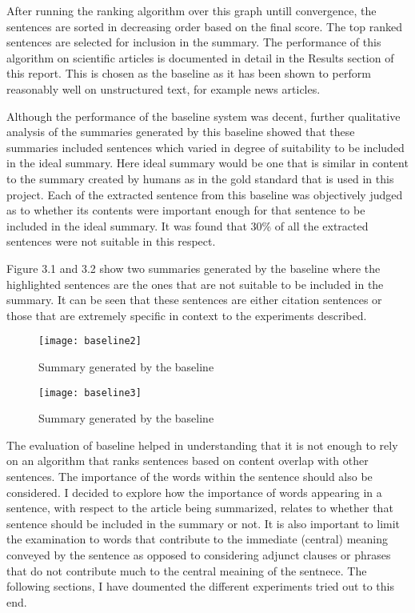 After running the ranking algorithm over this graph untill convergence, the sentences are sorted in decreasing order based on the final score.
The top ranked sentences are selected for inclusion in the summary.
The performance of this algorithm on scientific articles is documented in detail in the Results section of this report.
This is chosen as the baseline as it has been shown to perform reasonably well on unstructured text, for example news articles.

Although the performance of the baseline system was decent, further qualitative analysis of the summaries generated by this baseline showed that these summaries included sentences which varied in degree of suitability to be included in the ideal summary.
Here ideal summary would be one that is similar in content to the summary created by humans as in the gold standard that is used in this project.
Each of the extracted sentence from this baseline was objectively judged as to whether its contents were important enough for that sentence to be included in the ideal summary.
It was found that 30\% of all the extracted sentences were not suitable in this respect.

Figure 3.1 and 3.2 show two summaries generated by the baseline where the highlighted sentences are the ones that are not suitable to be included in the summary.
It can be seen that these sentences are either citation sentences or those that are extremely specific in context to the experiments described.

\begin{figure}[h]
\texttt{[image: baseline2]} 
\label{fig:base1}
\caption{Summary generated by the baseline}
\end{figure}
\begin{figure}[h]
\texttt{[image: baseline3]}
\label{fig:base2}
\caption{Summary generated by the baseline}
\label{fig:baseline}
\end{figure}

The evaluation of baseline helped in understanding that it is not enough to rely on an algorithm that ranks sentences based on content overlap with other sentences.
The importance of the words within the sentence should also be considered.
I decided to explore how the importance of words appearing in a sentence, with respect to the article being summarized, relates to whether that sentence should be included in the summary or not.
It is also important to limit the examination to words that contribute to the immediate (central) meaning conveyed by the sentence as opposed to considering adjunct clauses or phrases that do not contribute much to the central meaining of the sentnece.
The following sections, I have doumented the different experiments tried out to this end.

